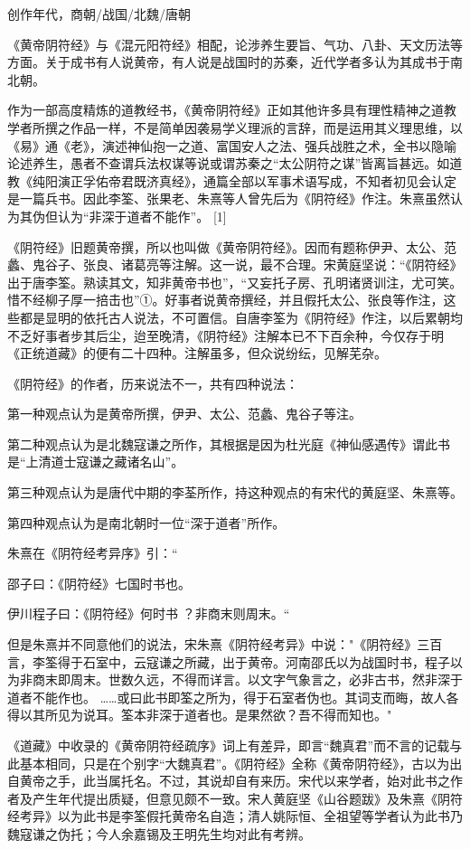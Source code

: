 \documentclass[12pt,UTF8]{ctexbook}
\begin{document}
创作年代，商朝/战国/北魏/唐朝

《黄帝阴符经》与《混元阳符经》相配，论涉养生要旨、气功、八卦、天文历法等方面。关于成书有人说黄帝，有人说是战国时的苏秦，近代学者多认为其成书于南北朝。

作为一部高度精炼的道教经书，《黄帝阴符经》正如其他许多具有理性精神之道教学者所撰之作品一样，不是简单因袭易学义理派的言辞，而是运用其义理思维，以《易》通《老》，演述神仙抱一之道、富国安人之法、强兵战胜之术，全书以隐喻论述养生，愚者不查谓兵法权谋等说或谓苏秦之“太公阴符之谋”皆离旨甚远。如道教《纯阳演正孚佑帝君既济真经》，通篇全部以军事术语写成，不知者初见会认定是一篇兵书。因此李筌、张果老、朱熹等人曾先后为《阴符经》作注。朱熹虽然认为其伪但认为“非深于道者不能作”。 [1]

《阴符经》旧题黄帝撰，所以也叫做《黄帝阴符经》。因而有题称伊尹、太公、范蠡、鬼谷子、张良、诸葛亮等注解。这一说，最不合理。宋黄庭坚说：“《阴符经》出于唐李筌。熟读其文，知非黄帝书也”，“又妄托子房、孔明诸贤训注，尤可笑。惜不经柳子厚一掊击也”①。好事者说黄帝撰经，并且假托太公、张良等作注，这些都是显明的依托古人说法，不可置信。自唐李筌为《阴符经》作注，以后累朝均不乏好事者步其后尘，迨至晚清，《阴符经》注解本已不下百余种，今仅存于明《正统道藏》的便有二十四种。注解虽多，但众说纷纭，见解芜杂。

《阴符经》的作者，历来说法不一，共有四种说法：

第一种观点认为是黄帝所撰，伊尹、太公、范蠡、鬼谷子等注。

第二种观点认为是北魏寇谦之所作，其根据是因为杜光庭《神仙感遇传》谓此书是“上清道士寇谦之藏诸名山”。

第三种观点认为是唐代中期的李荃所作，持这种观点的有宋代的黄庭坚、朱熹等。

第四种观点认为是南北朝时一位“深于道者”所作。

朱熹在《阴符经考异序》引：“

邵子曰：《阴符经》七国时书也。

伊川程子曰：《阴符经》何时书 ？非商末则周末。“

但是朱熹并不同意他们的说法，宋朱熹《阴符经考异》中说："《阴符经》三百言，李筌得于石室中，云寇谦之所藏，出于黄帝。河南邵氏以为战国时书，程子以为非商末即周末。世数久远，不得而详言。以文字气象言之，必非古书，然非深于道者不能作也。 ……或曰此书即筌之所为，得于石室者伪也。其词支而晦，故人各得以其所见为说耳。筌本非深于道者也。是果然欲？吾不得而知也。"

《道藏》中收录的《黄帝阴符经疏序》词上有差异，即言“魏真君”而不言的记载与此基本相同，只是在个别字“大魏真君”。《阴符经》全称《黄帝阴符经》，古以为出自黄帝之手，此当属托名。不过，其说却自有来历。宋代以来学者，始对此书之作者及产生年代提出质疑，但意见颇不一致。宋人黄庭坚《山谷题跋》及朱熹《阴符经考异》以为此书是李筌假托黄帝名自造；清人姚际恒、全祖望等学者认为此书乃魏寇谦之伪托；今人余嘉锡及王明先生均对此有考辨。
\end{document}
